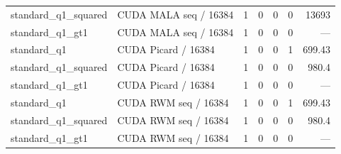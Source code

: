 \documentclass[UTF8,fontset=fandol,a4paper]{ctexart}
\begin{document}
\begin{longtable}{P{28mm}P{40mm}rrrrr}
standard\_\allowbreak{}q1\_\allowbreak{}squared & CUDA MALA seq / 16384 & 1 & 0 & 0 & 0 & 13693 \\
standard\_\allowbreak{}q1\_\allowbreak{}gt1 & CUDA MALA seq / 16384 & 1 & 0 & 0 & 0 & — \\
standard\_\allowbreak{}q1 & CUDA Picard / 16384 & 1 & 0 & 0 & 1 & 699.43 \\
standard\_\allowbreak{}q1\_\allowbreak{}squared & CUDA Picard / 16384 & 1 & 0 & 0 & 0 & 980.4 \\
standard\_\allowbreak{}q1\_\allowbreak{}gt1 & CUDA Picard / 16384 & 1 & 0 & 0 & 0 & — \\
standard\_\allowbreak{}q1 & CUDA RWM seq / 16384 & 1 & 0 & 0 & 1 & 699.43 \\
standard\_\allowbreak{}q1\_\allowbreak{}squared & CUDA RWM seq / 16384 & 1 & 0 & 0 & 0 & 980.4 \\
standard\_\allowbreak{}q1\_\allowbreak{}gt1 & CUDA RWM seq / 16384 & 1 & 0 & 0 & 0 & — \\
\bottomrule\end{longtable}\endgroup
\end{document}
